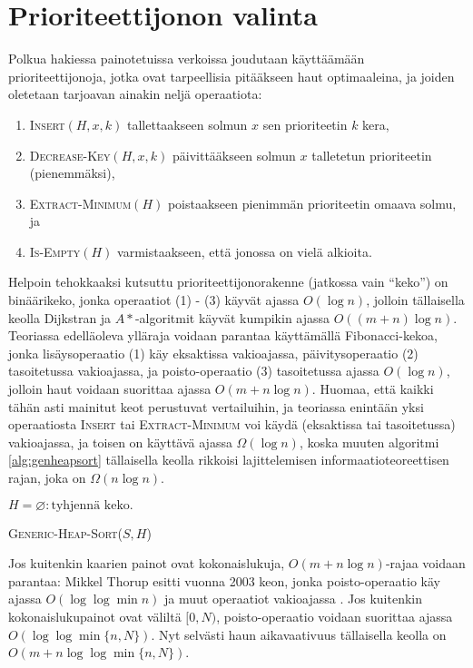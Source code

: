 \documentclass[finnish]{tktltiki2}
\newenvironment{finalgo}[1][htb]{
  \renewcommand{\algorithmcfname}{Algoritmi}
  \begin{algorithm}[#1]
}{\end{algorithm}}
\let\oldnl\nl%
\newcommand{\nonl}{\renewcommand{\nl}{\let\nl\oldnl}}
\theoremstyle{definition}
\theoremstyle{remark}
\begin{document}
\section{Prioriteettijonon valinta}
Polkua hakiessa painotetuissa verkoissa joudutaan käyttäämään prioriteettijonoja, jotka ovat tarpeellisia pitääkseen haut optimaaleina, ja joiden oletetaan tarjoavan ainakin neljä operaatiota:
\begin{enumerate}
\item \textsc{Insert}$(H, x, k)$ tallettaakseen solmun $x$ sen prioriteetin $k$ kera,
\item \textsc{Decrease-Key}$(H, x, k)$ päivittääkseen solmun $x$ talletetun prioriteetin (pienemmäksi),
\item \textsc{Extract-Minimum}$(H)$ poistaakseen pienimmän prioriteetin omaava solmu, ja
\item \textsc{Is-Empty}$(H)$ varmistaakseen, että jonossa on vielä alkioita.
\end{enumerate}
Helpoin tehokkaaksi kutsuttu prioriteettijonorakenne (jatkossa vain ``keko'') on binäärikeko, jonka operaatiot (1) - (3) käyvät ajassa $O(\log n)$, jolloin tällaisella keolla Dijkstran ja $A\ast$-algoritmit käyvät kumpikin ajassa $O((m + n) \log n)$. Teoriassa edelläoleva ylläraja voidaan parantaa käyttämällä Fibonacci-kekoa, jonka lisäysoperaatio (1) käy eksaktissa vakioajassa, päivitysoperaatio (2) tasoitetussa vakioajassa, ja poisto-operaatio (3) tasoitetussa ajassa $O(\log n)$, jolloin haut voidaan suorittaa ajassa $O(m + n \log n)$. Huomaa, että kaikki tähän asti mainitut keot perustuvat vertailuihin, ja teoriassa enintään yksi operaatiosta \textsc{Insert} tai \textsc{Extract-Minimum} voi käydä (eksaktissa tai tasoitetussa) vakioajassa, ja toisen on käyttävä ajassa $\Omega(\log n)$, koska muuten algoritmi \ref{alg:genheapsort} tällaisella keolla rikkoisi lajittelemisen informaatioteoreettisen rajan, joka on $\Omega(n \log n)$.
\begin{finalgo}
$H = \varnothing: \text{tyhjennä keko.}$ \\
\For{i = 1 \emph{\KwTo} |S|}{
  \nonl $S[i]$ on itsensä prioriteetti. \\
  \textsc{Insert}$(H, S[i], S[i])$ \\
}
\caption{\textsc{Generic-Heap-Sort}($S, H$)}
\label{alg:genheapsort}
\end{finalgo}
Jos kuitenkin kaarien painot ovat kokonaislukuja, $O(m + n \log n)$-rajaa voidaan parantaa:
Mikkel Thorup esitti vuonna 2003 keon, jonka poisto-operaatio käy ajassa $O(\log \log \min n)$ ja muut operaatiot vakioajassa \cite{Thorup03}. Jos kuitenkin kokonaislukupainot ovat väliltä $[0, N)$, poisto-operaatio voidaan suorittaa ajassa $O(\log \log \min \{ n, N \})$. Nyt selvästi haun aikavaativuus tällaisella keolla on $O(m + n \log \log \min \{n, N \})$.
\end{document}
